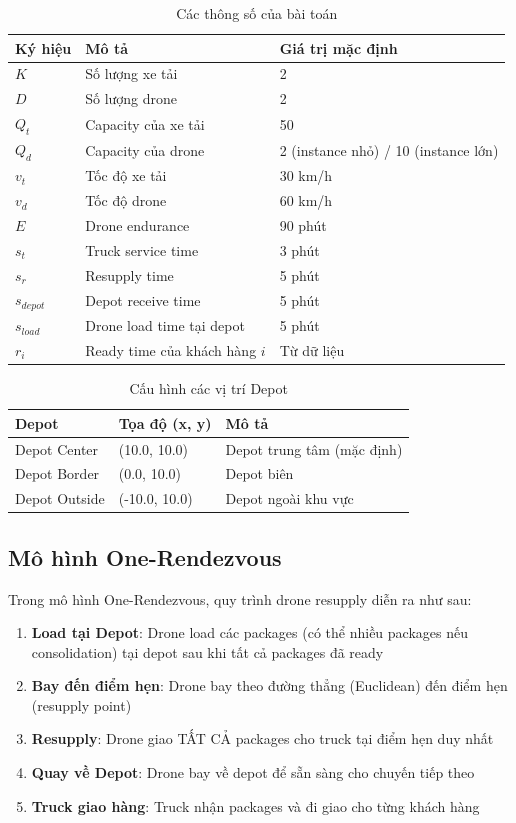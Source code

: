 \documentclass[12pt,a4paper]{article}
\begin{document}
\begin{table}[H]
\centering
\caption{Các thông số của bài toán}
\begin{tabular}{lll}
\toprule
\textbf{Ký hiệu} & \textbf{Mô tả} & \textbf{Giá trị mặc định} \\
\midrule
$K$ & Số lượng xe tải & 2 \\
$D$ & Số lượng drone & 2 \\
$Q_t$ & Capacity của xe tải & 50 \\
$Q_d$ & Capacity của drone & 2 (instance nhỏ) / 10 (instance lớn) \\
$v_t$ & Tốc độ xe tải & 30 km/h \\
$v_d$ & Tốc độ drone & 60 km/h \\
$E$ & Drone endurance & 90 phút \\
$s_t$ & Truck service time & 3 phút \\
$s_r$ & Resupply time & 5 phút \\
$s_{depot}$ & Depot receive time & 5 phút \\
$s_{load}$ & Drone load time tại depot & 5 phút \\
$r_i$ & Ready time của khách hàng $i$ & Từ dữ liệu \\
\bottomrule
\end{tabular}
\end{table}

\begin{table}[H]
\centering
\caption{Cấu hình các vị trí Depot}
\begin{tabular}{lll}
\toprule
\textbf{Depot} & \textbf{Tọa độ (x, y)} & \textbf{Mô tả} \\
\midrule
Depot Center & (10.0, 10.0) & Depot trung tâm (mặc định) \\
Depot Border & (0.0, 10.0) & Depot biên \\
Depot Outside & (-10.0, 10.0) & Depot ngoài khu vực \\
\bottomrule
\end{tabular}
\end{table}

\subsection{Mô hình One-Rendezvous}

Trong mô hình One-Rendezvous, quy trình drone resupply diễn ra như sau:

\begin{enumerate}
    \item \textbf{Load tại Depot}: Drone load các packages (có thể nhiều packages nếu consolidation) tại depot sau khi tất cả packages đã ready
    \item \textbf{Bay đến điểm hẹn}: Drone bay theo đường thẳng (Euclidean) đến điểm hẹn (resupply point)
    \item \textbf{Resupply}: Drone giao TẤT CẢ packages cho truck tại điểm hẹn duy nhất
    \item \textbf{Quay về Depot}: Drone bay về depot để sẵn sàng cho chuyến tiếp theo
    \item \textbf{Truck giao hàng}: Truck nhận packages và đi giao cho từng khách hàng
\end{enumerate}
\end{document}
